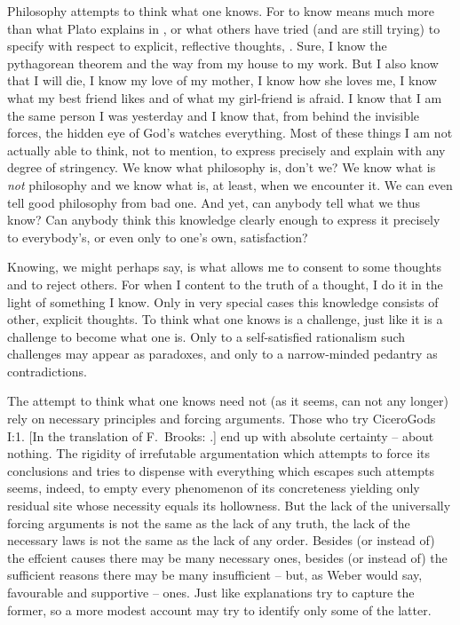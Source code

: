 Philosophy attempts to think what one knows. For to know means much more than
what Plato explains in , or what others have tried (and are still
trying) to specify with
respect to explicit, reflective thoughts, . Sure, I know the
pythagorean theorem and the way from my house to my work. But I also know that
I will die, I know my love of my mother, I know how she loves me, I know what my
best friend likes and of what my girl-friend is afraid. I know that I am the
same person I was yesterday and I know that, from behind the invisible forces,
the hidden eye of God's  watches everything. Most of these things I am not
actually able to think, not to mention, to express precisely and explain with
any degree of stringency.
%
We know what philosophy is, don't we? We know what is {\em not} philosophy and
we know what is, at least, when we encounter it. We can even tell good
philosophy from bad one. And yet, can anybody tell what we thus know? Can
anybody think this knowledge clearly enough to express it precisely to
everybody's, or even only to one's own, satisfaction? 
%

Knowing, we might perhaps say, is what allows me to
consent to some thoughts and to reject others. For when I content to the truth of
a thought, I do it in the light of something I know. Only in very special cases
this knowledge consists of other, explicit thoughts.
%
To think what one knows is a challenge, just like it is 
a challenge to become what one is. Only to a self-satisfied rationalism such challenges
may appear as paradoxes, and only to a narrow-minded pedantry as contradictions.

The attempt to think what one knows need not (as it seems, can not any longer)
rely on necessary principles and forcing arguments. Those who try
\citet{withholding their consent from any proposition that has not been
  proved}{CiceroGods}{ I:1. [In the translation of F.~Brooks: .]} end up with absolute 
certainty -- about nothing. The rigidity of irrefutable argumentation which
attempts to force its conclusions and tries to dispense with everything which
escapes such attempts seems, indeed, to empty every phenomenon of its
concreteness yielding only residual site whose necessity equals its hollowness.
But the lack of the universally forcing arguments is not the same as the lack of
any truth, the lack of the necessary laws is not the same as the lack of any
order. Besides (or instead of) the effcient causes there may be many necessary
ones, besides (or instead of) the sufficient reasons there may be many
insufficient -- but, as Weber would say, favourable and supportive -- ones. Just
like explanations try to capture the former, so a more modest account may try to
identify only some of the latter.

